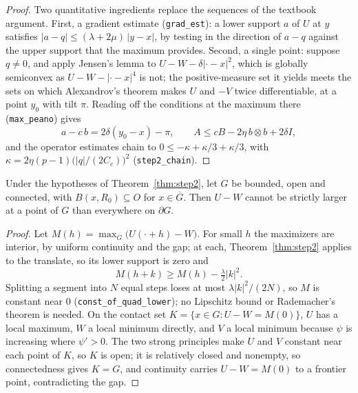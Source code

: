 \begin{proof}
\leanok
{}
Two quantitative ingredients replace the sequences of the textbook argument. First, a gradient estimate
(\texttt{grad\_est}): a lower support $a$ of $U$ at $y$ satisfies
$|a - q| \le (\lambda + 2\mu)\,|y - x|$, by testing in the direction of $a - q$
against the upper support that the maximum provides. Second, a single point:
suppose $q \ne 0$, and apply Jensen's lemma to
$U - W - \delta|\cdot - x|^2$, which is globally semiconvex as
$U - W - |\cdot - x|^4$ is not; the positive-measure set it yields meets the
sets on which Alexandrov's theorem makes $U$ and $-V$ twice differentiable, at a
point $y_0$ with tilt $\pi$. Reading off the conditions at the maximum there
(\texttt{max\_peano}) gives
\[
  a - c\,b = 2\delta(y_0 - x) - \pi, \qquad
  A \le cB - 2\eta\, b \otimes b + 2\delta I,
\]
and the operator estimates chain to
$0 \le -\kappa + \kappa/3 + \kappa/3$, with
$\kappa = 2\eta(p - 1)\bigl(|q|/(2C_c)\bigr)^2$ (\texttt{step2\_chain}).
\end{proof}


\begin{theorem}\label{thm:step3}
\leanok
Under the hypotheses of Theorem~\ref{thm:step2}, let $G$ be bounded, open and
connected, with $B(x, R_0) \subseteq O$ for $x \in \overline G$. Then $U - W$
cannot be strictly larger at a point of $G$ than everywhere on $\partial G$.
\end{theorem}

\begin{proof}
\leanok
{}
Let $M(h) = \max_{\overline G}\bigl(U(\cdot + h) - W\bigr)$. For small $h$ the
maximizers are interior, by uniform continuity and the gap; at each,
Theorem~\ref{thm:step2} applies to the translate, so its lower support is zero
and
\[
  M(h + k) \ge M(h) - \tfrac\lambda2 |k|^2 .
\]
Splitting a segment into $N$ equal steps loses at most $\lambda|k|^2/(2N)$, so
$M$ is constant near $0$ (\texttt{const\_of\_quad\_lower}); no Lipschitz bound
or Rademacher's theorem is needed. On the contact set
$K = \{x \in G : U - W = M(0)\}$, $U$ has a local maximum, $W$ a local minimum
directly, and $V$ a local minimum because $\psi$ is increasing where $\psi' > 0$.
The two strong principles make $U$ and $V$ constant near each point of $K$, so
$K$ is open; it is relatively closed and nonempty, so connectedness gives
$K = G$, and continuity carries $U - W = M(0)$ to a frontier point, contradicting
the gap.
\end{proof}


